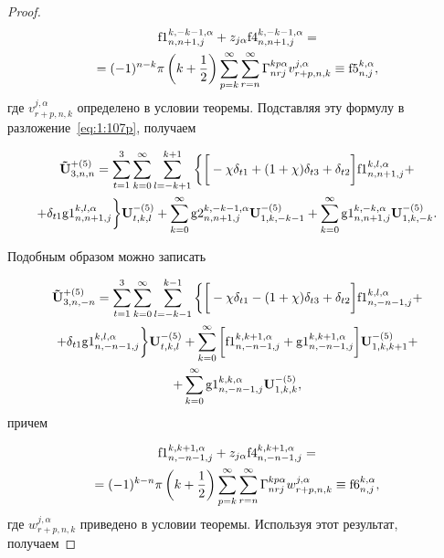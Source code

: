 \begin{russian}
\begin{proof}
\begin{multline*}
{\rm f1}_{n,n+1,j}^{k,-k-1,\alpha}+z_{j\alpha}{\rm f4}_{n,n+1,j}^{k,-k-1,\alpha}= \\
=(-1)^{n-k}\pi \left( {k + \frac{1}{2}} \right)\sum\limits_{p = k}^\infty  \sum\limits_{r = n}^\infty\Gamma _{nrj}^{kp\alpha }v_{r+p,n,k}^{j,\alpha}\equiv{\rm f5}_{n,j}^{k,\alpha},
\end{multline*}
где $v_{r+p,n,k}^{j,\alpha}$ определено в условии теоремы. Подставляя эту формулу в разложение~\eqref{eq:1:107p}, получаем

\begin{multline}
\mathbf{\tilde U}_{3,n,n}^{+(5)}=\sum\limits_{t=1}^3\sum\limits_{k=0}^\infty\sum\limits_{l=-k+1}^{k+1}\bigg\{\bigg\lbrack-\chi\delta_{t1}+(1+\chi)\delta_{t3}+\delta_{t2}\bigg\rbrack{\rm f1}_{n,n+1,j}^{k,l,\alpha}+ \\
+\delta_{t1}{\rm g1}_{n,n+1,j}^{k,l,\alpha}\bigg\}\mathbf{U}_{t,k,l}^{-(5)}+\sum\limits_{k=0}^\infty{\rm g2}_{n,n+1,j}^{k,-k-1,\alpha}\mathbf{U}_{1,k,-k-1}^{-(5)}+\sum\limits_{k=0}^\infty{\rm g1}_{n,n+1,j}^{k,-k,\alpha}\mathbf{U}_{1,k,-k}^{-(5)}.
\label{eq:1:109p}
\end{multline}

Подобным образом можно записать

\begin{multline}
\mathbf{\tilde U}_{3,n,-n}^{+(5)}=\sum\limits_{t=1}^3\sum\limits_{k=0}^\infty\sum\limits_{l=-k-1}^{k-1}\bigg\{\bigg\lbrack-\chi\delta_{t1}-(1+\chi)\delta_{t3}+\delta_{t2}\bigg\rbrack{\rm f1}_{n,-n-1,j}^{k,l,\alpha}+ \\
+\delta_{t1}{\rm g1}_{n,-n-1,j}^{k,l,\alpha}\bigg\}\mathbf{U}_{t,k,l}^{-(5)}+\sum\limits_{k=0}^\infty\bigg\lbrack{\rm f1}_{n,-n-1,j}^{k,k+1,\alpha}+{\rm g1}_{n,-n-1,j}^{k,k+1,\alpha}\bigg\rbrack\mathbf{U}_{1,k,k+1}^{-(5)}+ \\
+\sum\limits_{k=0}^\infty{\rm g1}_{n,-n-1,j}^{k,k,\alpha}\mathbf{U}_{1,k,k}^{-(5)},
\label{eq:1:110p}
\end{multline}
причем

\begin{multline*}
{\rm f1}_{n,-n-1,j}^{k,k+1,\alpha}+z_{j\alpha}{\rm f4}_{n,-n-1,j}^{k,k+1,\alpha}= \\
=(-1)^{k-n}\pi\left( {k+\frac{1}{2}} \right)\sum\limits_{p = k}^\infty  \sum\limits_{r = n}^\infty\Gamma _{nrj}^{kp\alpha }w_{r+p,n,k}^{j,\alpha}\equiv{\rm f6}_{n,j}^{k,\alpha},
\end{multline*}
где $w_{r+p,n,k}^{j,\alpha}$ приведено в условии теоремы. Используя этот результат, получаем


\end{proof}
\end{russian}
